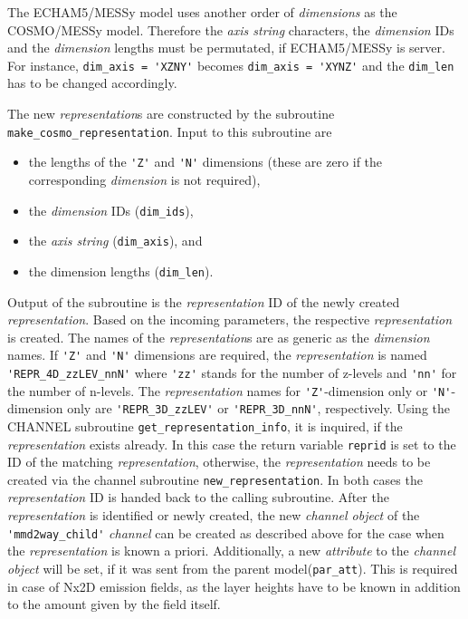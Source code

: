 \documentclass[11pt,twoside]{article}
\begin{document}
\begin{itemize}
\begin{enumerate}
\begin{itemize}
\begin{itemize}
The ECHAM5/MESSy model uses another order of 
{\it dimensions} as the COSMO/MESSy model. Therefore
the {\it axis string} characters, the {\it dimension} IDs and the 
{\it dimension} lengths must be permutated, if ECHAM5/MESSy is server.
For instance, \verb|dim_axis = 'XZNY'| becomes \verb|dim_axis = 'XYNZ'| and the 
\verb|dim_len| has to be changed accordingly. 

The new {\it representation}s are constructed by the subroutine 
\verb|make_cosmo_representation|. Input to this subroutine are
\begin{itemize}%
\item  the lengths of the \verb|'Z'| and \verb|'N'| dimensions (these are zero 
if the corresponding {\it dimension} is not required), 
\item the {\it dimension} IDs (\verb|dim_ids|), 
\item the {\it axis string} (\verb|dim_axis|),  and 
\item the dimension lengths (\verb|dim_len|). 
\end{itemize}%
Output of the subroutine is the {\it representation} ID  of the newly created 
{\it representation}.
Based on the incoming parameters, the respective {\it representation} is created.
The names of the {\it representation}s are as generic as the {\it dimension} 
names.
If \verb|'Z'| and \verb|'N'| dimensions are required, the {\it representation}
is named \verb|'REPR_4D_zzLEV_nnN'| where \verb|'zz'| stands for the number
of z-levels and \verb|'nn'| for the number of n-levels.
The {\it representation} names for \verb|'Z'|-dimension only or 
\verb|'N'|-dimension only are  \verb|'REPR_3D_zzLEV'| or  \verb|'REPR_3D_nnN'|,
respectively. Using the CHANNEL subroutine \verb|get_representation_info|, it is
 inquired, if the {\it representation} exists already. 
In this case the return variable \verb|reprid| is set to the ID of the
matching {\it representation}, otherwise, the {\it representation} needs to be created
via the channel subroutine \verb|new_representation|.
In both cases the {\it representation} ID is handed back to the calling 
subroutine. After the {\it representation} is identified or newly created,
 the new {\it channel object} of the \verb|'mmd2way_child'| {\it channel} can be 
created as described above for the case 
when the {\it representation} is known a priori. Additionally, a new {\it 
attribute} to the {\it channel object} will be set, if it was sent from the 
parent model(\verb|par_att|). This is required in case of Nx2D emission
 fields,  as the layer heights
have to be known in addition to the amount given by the field itself. 


\end{itemize}
\end{itemize}
\end{enumerate}
\end{itemize}
\end{document}
